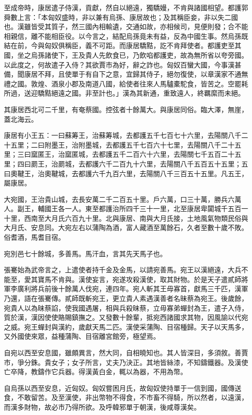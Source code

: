 \begin{pinyinscope}
至成帝時，康居遣子侍漢，貢獻，然自以絕遠，獨驕嫚，不肯與諸國相望。都護郭舜數上言：「本匈奴盛時，非以兼有烏孫、康居故也；及其稱臣妾，非以失二國也。漢雖皆受其質子，然三國內相輸遺，交通如故，亦相候司，見便則發；合不能相親信，離不能相臣役。以今言之，結配烏孫竟未有益，反為中國生事。然烏孫既結在前，今與匈奴俱稱臣，義不可距。而康居驕黠，訖不肯拜使者。都護吏至其國，坐之烏孫諸使下，王及貴人先飲食已，乃飲啗都護吏，故為無所省以夸旁國。以此度之，何故遣子入侍？其欲賈市為好，辭之詐也。匈奴百蠻大國，今事漢甚備，聞康居不拜，且使單于有自下之意，宜歸其侍子，絕勿復使，以章漢家不通無禮之國。敦煌、酒泉小郡及南道八國，給使者往來人馬驢橐駝食，皆苦之。空罷耗所過，送迎驕黠絕遠之國。非至計也。」漢為其新通，重致遠人，終羈縻而未絕。

其康居西北可二千里，有奄蔡國。控弦者十餘萬大。與康居同俗。臨大澤，無崖，蓋北海云。

康居有小王五：一曰蘇筹王，治蘇筹城，去都護五千七百七十六里，去陽關八千二十五里；二曰附墨王，治附墨城，去都護五千七百六十七里，去陽關八千二十五里；三曰窳匿王，治窳匿城，去都護五千二百六十六里，去陽關七千五百二十五里；四曰罽王，治罽城，去都護六千二百九十六里，去陽關八千五百五十五里；五曰奧鞬王，治奧鞬城，去都護六千九百六里，去陽關八千三百五十五里。凡五王，屬康居。

大宛國，王治貴山城，去長安萬二千二百五十里。戶六萬，口三十萬，勝兵六萬人。副王，輔國王各一人。東至都護治所四千三十一里，北至康居卑闐城千五百一十里，西南至大月氏六百九十里。北與康居、南與大月氏接，土地風氣物類民俗與大月氏、安息同。大宛左右以蒲陶為酒，富人藏酒至萬餘石，久者至數十歲不敗。俗耆酒，馬耆目宿。

宛別邑七十餘城，多善馬。馬汗血，言其先天馬子也。

張騫始為武帝言之，上遣使者持千金及金馬，以請宛善馬。宛王以漢絕遠，大兵不能至，愛其寶馬不肯與。漢使妄言，宛遂攻殺漢使，取其財物。於是天子遣貳師將軍李廣利將兵前後十餘萬人伐宛，連四年。宛人斬其王毋寡首，獻馬三千匹，漢軍乃還，語在張騫傳。貳師既斬宛王，更立貴人素遇漢善者名昧蔡為宛王。後歲餘，宛貴人以為昧蔡諂，使我國遇屠，相與兵殺昧蔡，立毋寡弟蟬封為王，遣子入侍，質於漢，漢因使使賂賜鎮撫之。又發數十餘輩，抵宛西諸國求其物，因風諭以代宛之威。宛王蟬封與漢約，歲獻天馬二匹。漢使采蒲陶、目宿種歸。天子以天馬多，又外國使來眾，益種蒲陶、目宿離宮館旁，極望焉。

自宛以西至安息國，雖頗異言，然大同，自相曉知也。其人皆深目，多須敘。善賈市，爭分銖。貴女子；女子所言，丈夫乃決正。其地皆絲漆，不知鑄鐵器。及漢使亡卒降，教鑄作它兵器。得漢黃白金，輒以為器，不用為幣。

自烏孫以西至安息，近匈奴。匈奴嘗困月氏，故匈奴使持單于一信到國，國傳送食，不敢留苦。及至漢使，非出幣物不得食，不市畜不得騎，所以然者，以遠漢，而漢多財物，故必市乃得所欲。及呼韓邪單于朝漢，後咸尊漢矣。


\end{pinyinscope}
